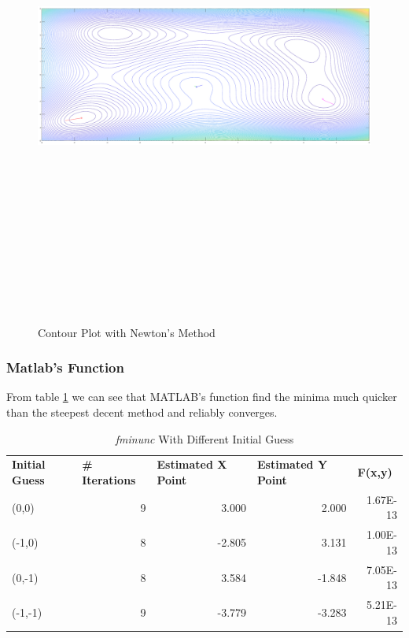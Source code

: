 \documentclass[12pt]{article}
\begin{document}
\begin{landscape}
\begin{figure}[h!]
    \centering
    \includegraphics[width=9in,height=6.5in]{NM_Contour.eps}
    \caption{Contour Plot with Newton's Method}
    \label{fig:SDM_Contour}
\end{figure}
\end{landscape}

\subsubsection{Matlab's Function}
From table \ref{tab:fminunc} we can see that MATLAB's function find the minima much quicker than the steepest decent method and reliably converges.
\begin{table}[htbp]
  \centering
  \caption{\textit{fminunc} With Different Initial Guess}
    \begin{tabular}{lrrrr}
    \textbf{Initial Guess} & \multicolumn{1}{l}{\textbf{\# Iterations}} & \multicolumn{1}{l}{\textbf{Estimated X Point}} & \multicolumn{1}{l}{\textbf{Estimated Y Point}} & \multicolumn{1}{l}{\textbf{F(x,y)}} \\
    (0,0) & 9     & 3.000 & 2.000 & 1.67E-13 \\
    (-1,0) & 8     & -2.805 & 3.131 & 1.00E-13 \\
    (0,-1) & 8     & 3.584 & -1.848 & 7.05E-13 \\
    (-1,-1) & 9     & -3.779 & -3.283 & 5.21E-13 \\
    \end{tabular}%
  \label{tab:fminunc}%
\end{table}%
\end{document}
